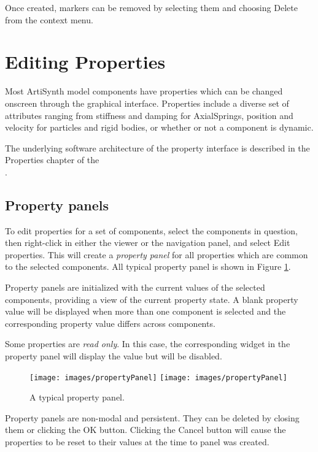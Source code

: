 \documentclass{article}
\begin{document}
Once created, markers can be removed by selecting them and choosing
{\sf Delete} from the context menu.

\section{Editing Properties}

Most ArtiSynth model components have properties which can be 
changed onscreen through the graphical interface. Properties
include a diverse set of attributes ranging from stiffness and
damping for AxialSprings, position and velocity for particles and
rigid bodies, or whether or not a component is dynamic.

The underlying software architecture of the property interface is 
described in the Properties chapter of the\\
.

\subsection{Property panels}
\label{propertyPanelsSec}

To edit properties for a set of components, select the components in
question, then right-click in either the viewer or the navigation
panel, and select {\sf Edit properties}. This will create a {\it property
panel} for all properties which are common to the selected components.
All typical property panel is shown in Figure \ref{propertyPanelFig}.

Property panels are initialized with the current values of the selected
components, providing a view of the current property state. A blank
property value will be displayed when more than one component is selected and 
the corresponding property value differs across components.

Some properties are {\it read only}. In this case, the corresponding
widget in the property panel will display the value but will be
disabled.

\begin{figure}[h]
\begin{center}
\iflatexml
\texttt{[image: images/propertyPanel]}
\else
\texttt{[image: images/propertyPanel]}
\fi
\end{center}
\caption{A typical property panel.}%
\label{propertyPanelFig}
\end{figure}

Property panels are non-modal and persistent. 
They can be deleted by
closing them or clicking the {\sf OK} button. Clicking the {\sf Cancel} button
will cause the properties to be reset to their values at the time to
panel was created.
\end{document}

